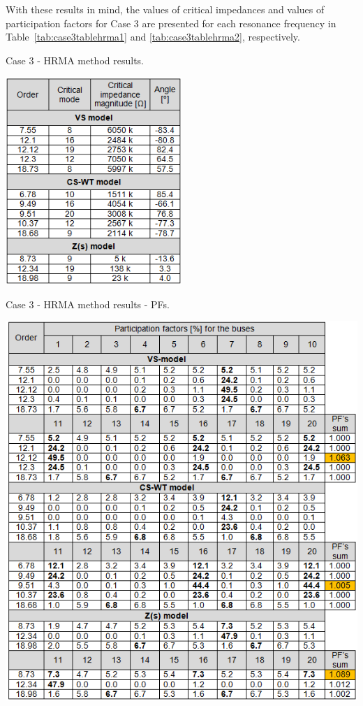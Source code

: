 \documentclass[12pt]{report} %
\begin{document}
With these results in mind, the values of critical impedances and values of participation factors for Case 3 are presented for each resonance frequency in Table~\ref{tab:case3tablehrma1} and \ref{tab:case3tablehrma2}, respectively.

\begin{table}[htb]
	\centering
	\caption{Case 3 - HRMA method results.}
	\label{tab:case3tablehrma1}
	\includegraphics[width=0.5\textwidth]{img/Case3/table_HRMA1.png}
\end{table}
\FloatBarrier

\begin{table}[htb]
	\caption{Case 3 - HRMA method results - PFs.}
	\label{tab:case3tablehrma2}
	\centering
	\includegraphics[width=1\textwidth]{img/Case3/table_HRMA2.png}
\end{table}
\FloatBarrier
\end{document}
